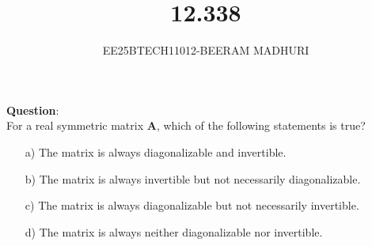 \documentclass[journal]{IEEEtran}
\begin{document}

\vspace{3cm}

\title{12.338}
\author{EE25BTECH11012-BEERAM MADHURI}
{\let\newpage\relax\maketitle}

\renewcommand{\thefigure}{\theenumi}
\renewcommand{\thetable}{\theenumi}
\setlength{\intextsep}{10pt} %


\renewcommand{\thetable}{\theenumi}


\textbf{Question}:\\
For a real symmetric matrix $\mathbf{A}$, which of the following statements is true?

\begin{enumerate}
    \item[a)] The matrix is always diagonalizable and invertible.
    \item[b)] The matrix is always invertible but not necessarily diagonalizable.
    \item[c)] The matrix is always diagonalizable but not necessarily invertible.
    \item[d)] The matrix is always neither diagonalizable nor invertible.
\end{enumerate}
\end{document}
